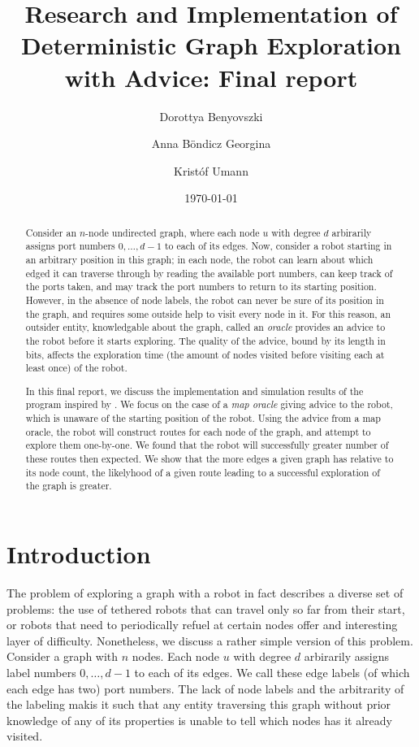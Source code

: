 \documentclass{article}
\title{Research and Implementation of Deterministic Graph Exploration with Advice: Final report}
\author[1]{Dorottya Benyovszki}
\author[1]{Anna Böndicz Georgina}
\author[1]{Kristóf Umann}
\affil[1]{Eötvös Loránd University, Faculty of Informatics}
\date{\today}
\begin{document}
\maketitle

\begin{abstract}
  Consider an $n$-node undirected graph, where each node $u$ with degree $d$ arbirarily assigns port numbers $0,\dots,d-1$ to each of its edges. Now, consider a robot starting in an arbitrary position in this graph; in each node, the robot can learn about which edged it can traverse through by reading the available port numbers, can keep track of the ports taken, and may track the port numbers to return to its starting position. However, in the absence of node labels, the robot can never be sure of its position in the graph, and requires some outside help to visit every node in it. For this reason, an outsider entity, knowledgable about the graph, called an \textit{oracle} provides an advice to the robot before it starts exploring. The quality of the advice, bound by its length in bits, affects the exploration time (the amount of nodes visited before visiting each at least once) of the robot.

  In this final report, we discuss the implementation and simulation results of the program inspired by \cite{gorain2018deterministic}. We focus on the case of a \textit{map oracle} giving advice to the robot, which is unaware of the starting position of the robot. Using the advice from a map oracle, the robot will construct routes for each node of the graph, and attempt to explore them one-by-one. We found that the robot will successfully greater number of these routes then expected. We show that the more edges a given graph has relative to its node count, the likelyhood of a given route leading to a successful exploration of the graph is greater.

\end{abstract}

\section{Introduction}
\label{sec:introduction}

The problem of exploring a graph with a robot in fact describes a diverse set of problems: the use of tethered robots that can travel only so far from their start, or robots that need to periodically refuel at certain nodes offer and interesting layer of difficulty. Nonetheless, we discuss a rather simple version of this problem. Consider a graph with $n$ nodes. Each node $u$ with degree $d$ arbirarily assigns label numbers $0,\dots,d-1$ to each of its edges. We call these edge labels (of which each edge has two) port numbers. The lack of node labels and the arbitrarity of the labeling makis it such that any entity traversing this graph without prior knowledge of any of its properties is unable to tell which nodes has it already visited.
\end{document}
